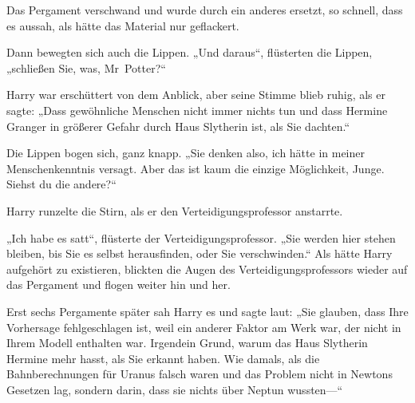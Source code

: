 Das Pergament verschwand und wurde durch ein anderes ersetzt, so schnell, dass es aussah, als hätte das Material nur geflackert.

Dann bewegten sich auch die Lippen.
„Und daraus“, flüsterten die Lippen, „schließen Sie, was, Mr~Potter?“

Harry war erschüttert von dem Anblick, aber seine Stimme blieb ruhig, als er sagte:
„Dass gewöhnliche Menschen nicht immer nichts tun und dass Hermine Granger in größerer Gefahr durch Haus Slytherin ist, als Sie dachten.“

Die Lippen bogen sich, ganz knapp.
„Sie denken also, ich hätte in meiner Menschenkenntnis versagt. Aber das ist kaum die einzige Möglichkeit, Junge. Siehst du die andere?“

Harry runzelte die Stirn, als er den Verteidigungsprofessor anstarrte.

„Ich habe es satt“, flüsterte der Verteidigungsprofessor.
„Sie werden hier stehen bleiben, bis Sie es selbst herausfinden, oder Sie verschwinden.“ Als hätte Harry aufgehört zu existieren, blickten die Augen des Verteidigungsprofessors wieder auf das Pergament und flogen weiter hin und her.

Erst sechs Pergamente später sah Harry es und sagte laut:
„Sie glauben, dass Ihre Vorhersage fehlgeschlagen ist, weil ein anderer Faktor am Werk war, der nicht in Ihrem Modell enthalten war. Irgendein Grund, warum das Haus Slytherin Hermine mehr hasst, als Sie erkannt haben. Wie damals, als die Bahnberechnungen für Uranus falsch waren und das Problem nicht in Newtons Gesetzen lag, sondern darin, dass sie nichts über Neptun wussten—“

